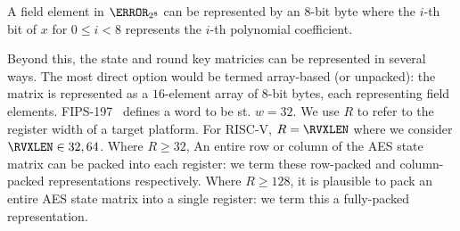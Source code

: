 
A field element in $\F_{2^8}$ can be represented by an
$8$-bit byte
where the $i$-th bit of $x$ for $0 \leq i < 8$ represents the $i$-th 
polynomial coefficient.

Beyond this, the state and round key matricies can be represented in
several ways.
The most direct option would be termed
array-based (or unpacked):
the matrix is represented as a $16$-element array of $8$-bit bytes, each
representing field elements.
FIPS-197~\cite{FIPS:197} defines a word to be st. $w = 32$.
We use $R$ to refer to the register width of a target platform.
For RISC-V, $R = \RVXLEN$ where we consider $\RVXLEN \in {32,64}$.
Where $R \geq  32$,
An entire row or column of the AES state matrix can be packed into each 
register:
we term these
   row-packed  
and
column-packed
representations respectively.
Where $R \geq 128$, 
it is plausible to pack
an entire AES state matrix
into a single register: 
we term this a 
 fully-packed 
representation.

